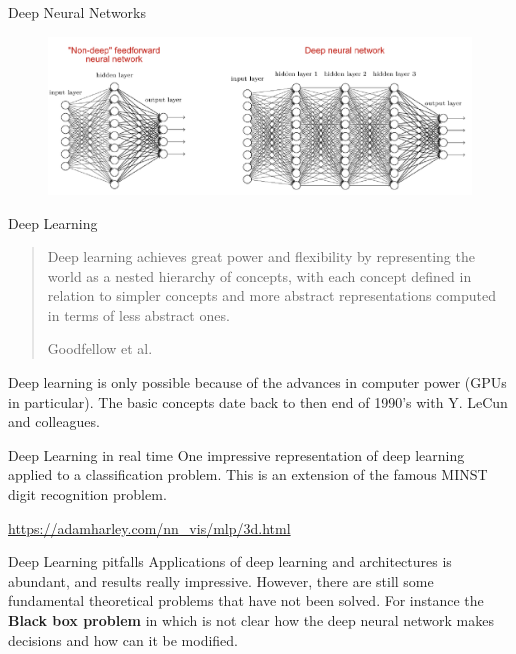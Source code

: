 \documentclass[11pt, aspectratio=43]{beamer}
\begin{document}
\begin{frame}{Deep Neural Networks}
			\begin{figure}[h]
	\centering
	\includegraphics[scale=0.4]{Figures/fig_deep_nn.png}
\end{figure}		
\end{frame}

\begin{frame}{Deep Learning}
	
	\begin{quote}
		Deep learning achieves great power and flexibility by representing the world as a nested hierarchy of concepts, with each concept defined in relation to simpler concepts and more abstract representations computed in terms of less abstract ones.
		
		Goodfellow et al. 
	\end{quote}
	


Deep  learning is only possible because of the advances in computer power (GPUs in particular). The basic concepts date back to then end of 1990's with Y. LeCun and colleagues. 
\end{frame}

\begin{frame}{Deep Learning in real time}
	One impressive representation of deep learning applied to a classification problem. This is an extension of the famous MINST digit recognition problem. 
	
	\url{https://adamharley.com/nn_vis/mlp/3d.html}
	
\end{frame}

\begin{frame}{Deep Learning pitfalls}
	Applications of deep learning and architectures is abundant, and results really impressive. 
	However, there are still some fundamental theoretical problems that have not been solved.
	For instance the \textbf{Black box problem} in which is not clear how the deep neural network makes decisions and how can it be modified.  
\end{frame}
\end{document}
